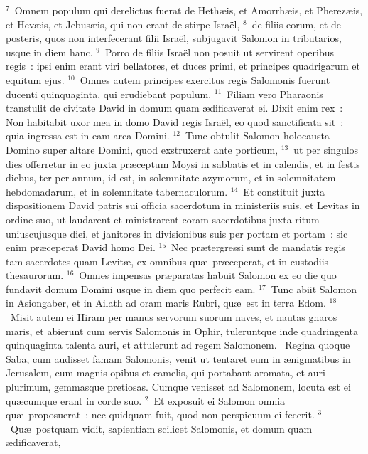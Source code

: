 ${}^{7}$~Omnem populum qui derelictus fuerat de Heth\ae is, et Amorrh\ae is, et Pherez\ae is, et Hev\ae is, et Jebus\ae is, qui non erant de stirpe Isra\"el,
${}^{8}$~de filiis eorum, et de posteris, quos non interfecerant filii Isra\"el, subjugavit Salomon in tributarios, usque in diem hanc.
${}^{9}$~Porro de filiis Isra\"el non posuit ut servirent operibus regis~: ipsi enim erant viri bellatores, et duces primi, et principes quadrigarum et equitum ejus.
${}^{10}$~Omnes autem principes exercitus regis Salomonis fuerunt ducenti quinquaginta, qui erudiebant populum.
${}^{11}$~Filiam vero Pharaonis transtulit de civitate David in domum quam \ae dificaverat ei. Dixit enim rex~: Non habitabit uxor mea in domo David regis Isra\"el, eo quod sanctificata sit~: quia ingressa est in eam arca Domini.
${}^{12}$~Tunc obtulit Salomon holocausta Domino super altare Domini, quod exstruxerat ante porticum,
${}^{13}$~ut per singulos dies offerretur in eo juxta pr\ae ceptum Moysi in sabbatis et in calendis, et in festis diebus, ter per annum, id est, in solemnitate azymorum, et in solemnitatem hebdomadarum, et in solemnitate tabernaculorum.
${}^{14}$~Et constituit juxta dispositionem David patris sui officia sacerdotum in ministeriis suis, et Levitas in ordine suo, ut laudarent et ministrarent coram sacerdotibus juxta ritum uniuscujusque diei, et janitores in divisionibus suis per portam et portam~: sic enim pr\ae ceperat David homo Dei.
${}^{15}$~Nec pr\ae tergressi sunt de mandatis regis tam sacerdotes quam Levit\ae , ex omnibus qu\ae\ pr\ae ceperat, et in custodiis thesaurorum.
${}^{16}$~Omnes impensas pr\ae paratas habuit Salomon ex eo die quo fundavit domum Domini usque in diem quo perfecit eam.
${}^{17}$~Tunc abiit Salomon in Asiongaber, et in Ailath ad oram maris Rubri, qu\ae\ est in terra Edom.
${}^{18}$~Misit autem ei Hiram per manus servorum suorum naves, et nautas gnaros maris, et abierunt cum servis Salomonis in Ophir, tuleruntque inde quadringenta quinquaginta talenta auri, et attulerunt ad regem Salomonem.
~\lettrine[lines=10,image=true,loversize=0.05,lraise=-0.03]{R}{}egina quoque Saba, cum audisset famam Salomonis, venit ut tentaret eum in \ae nigmatibus in Jerusalem, cum magnis opibus et camelis, qui portabant aromata, et auri plurimum, gemmasque pretiosas. Cumque venisset ad Salomonem, locuta est ei qu\ae cumque erant in corde suo.
${}^{2}$~Et exposuit ei Salomon omnia qu\ae\ proposuerat~: nec quidquam fuit, quod non perspicuum ei fecerit.
${}^{3}$~Qu\ae\ postquam vidit, sapientiam scilicet Salomonis, et domum quam \ae dificaverat,
